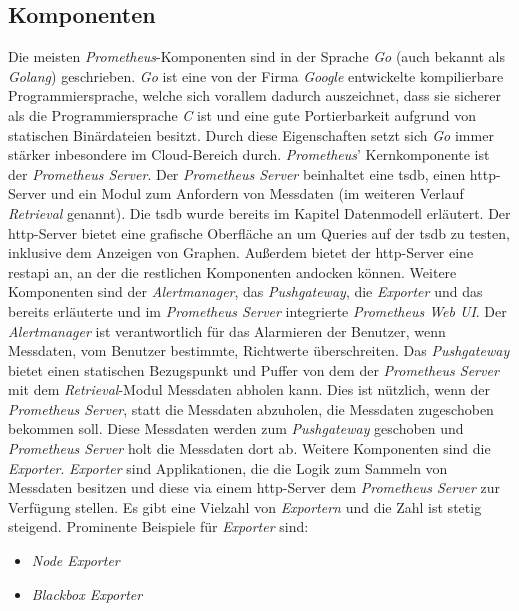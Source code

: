 \documentclass[titlepage]{report}
\begin{document}
\subsection*{Komponenten}
Die meisten \emph{Prometheus}\hyp{}Komponenten sind in der Sprache
\emph{Go} (auch bekannt als \emph{Golang}) geschrieben. \emph{Go} ist
eine von der Firma \emph{Google} entwickelte kompilierbare
Programmiersprache, welche sich vorallem dadurch auszeichnet, dass sie
sicherer als die Programmiersprache \emph{C} ist und eine gute
Portierbarkeit aufgrund von statischen Binärdateien besitzt. Durch diese
Eigenschaften setzt sich \emph{Go} immer stärker inbesondere im
Cloud\hyp{}Bereich durch\cite{INFOWORLD}. \emph{Prometheus}'
Kernkomponente ist der \emph{Prometheus Server}. Der \emph{Prometheus
Server} beinhaltet eine \gls{tsdb}, einen \gls{http}\hyp{}Server und ein
Modul zum Anfordern von Messdaten (im weiteren Verlauf
\emph{Retrieval} genannt). Die \gls{tsdb} wurde bereits im Kapitel
Datenmodell erläutert. Der \gls{http}\hyp{}Server bietet eine grafische
Oberfläche an um Queries auf der \gls{tsdb} zu testen, inklusive
dem Anzeigen von Graphen. Außerdem bietet der \gls{http}\hyp{}Server
eine \gls{restapi} an, an der die restlichen Komponenten andocken
können. Weitere Komponenten sind der \emph{Alertmanager}, das
\emph{Pushgateway}, die \emph{Exporter} und das bereits erläuterte und
im \emph{Prometheus Server} integrierte \emph{Prometheus Web UI}. Der
\emph{Alertmanager} ist verantwortlich für das Alarmieren der Benutzer,
wenn Messdaten, vom Benutzer bestimmte, Richtwerte überschreiten. Das
\emph{Pushgateway} bietet einen statischen Bezugspunkt und Puffer von dem der
\emph{Prometheus Server} mit dem \emph{Retrieval}\hyp{}Modul Messdaten
abholen kann. Dies ist nützlich, wenn der \emph{Prometheus Server}, statt
die Messdaten abzuholen, die Messdaten zugeschoben bekommen soll. Diese Messdaten
werden zum \emph{Pushgateway} geschoben und \emph{Prometheus
Server} holt die Messdaten dort ab. Weitere Komponenten sind die
\emph{Exporter}. \emph{Exporter} sind Applikationen, die die
Logik zum Sammeln von Messdaten besitzen und diese via einem
\gls{http}\hyp{}Server dem \emph{Prometheus Server} zur Verfügung
stellen. Es gibt eine Vielzahl von
\emph{Exportern} und die Zahl ist stetig steigend. Prominente Beispiele
für \emph{Exporter} sind:
\begin{itemize}
    \item \emph{Node Exporter}
    \item \emph{Blackbox Exporter}
\end{itemize}
\end{document}
